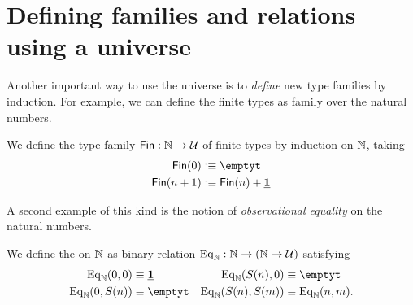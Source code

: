 \section{Defining families and relations using a universe}
Another important way to use the universe is to \emph{define} new type families by induction. For example, we can define the finite types as family over the natural numbers.

\begin{defn}\label{defn:fin}
We define the type family $\mathsf{Fin}:\mathbb{N}\to\mathcal{U}$ of finite types by induction on $\mathbb{N}$, taking
\begin{align*}
\mathsf{Fin}(0) & \defeq \emptyt \\
\mathsf{Fin}(n+1) & \defeq \mathsf{Fin}(n)+\unit
\end{align*}
\end{defn}

A second example of this kind is the notion of \emph{observational equality} on the natural numbers.

\begin{defn}\label{defn:obs_nat}
We define the  on $\mathbb{N}$ as binary relation $\mathrm{Eq}_\mathbb{N}:\mathbb{N}\to(\mathbb{N}\to\mathcal{U})$ satisfying
\begin{align*}
\mathrm{Eq}_\N(0,0) & \jdeq \unit & \mathrm{Eq}_\N(S(n),0) & \jdeq \emptyt \\
\mathrm{Eq}_\N(0,S(n)) & \jdeq \emptyt & \mathrm{Eq}_\N(S(n),S(m)) & \jdeq \mathrm{Eq}_\N(n,m).
\end{align*}
\end{defn}

